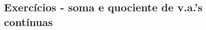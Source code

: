 \documentclass[../Notas.tex]{subfiles}
\begin{document}
\subsection{Exercícios - soma e quociente de v.a.'s contínuas}
\end{document}
